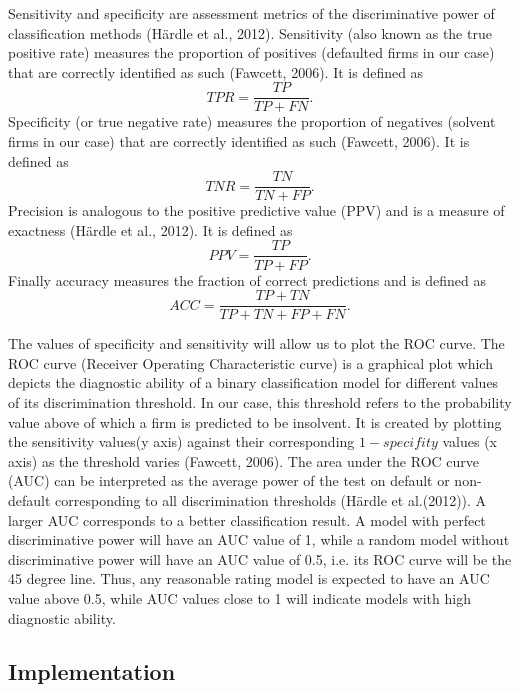 \documentclass{article}
\begin{document}
Sensitivity and specificity are assessment metrics of the discriminative power of classification methods (H{\"a}rdle et al., 2012). Sensitivity (also known as the true positive rate) measures the proportion of positives (defaulted firms in our case) that are correctly identified as such (Fawcett, 2006). It is defined as $$TPR=\frac{TP}{TP+FN}.$$ Specificity (or true negative rate) measures the proportion of negatives (solvent firms in our case) that are correctly identified as such (Fawcett, 2006). It is defined as $$TNR=\frac{TN}{TN+FP}.$$ Precision is analogous to the positive predictive value (PPV) and is a measure of exactness (H{\"a}rdle et al., 2012). It is defined as $$PPV=\frac{TP}{TP+FP}.$$ Finally accuracy measures the fraction of correct predictions and is defined as $$ACC = \frac{TP+TN}{TP+TN+FP+FN}.$$

The values of specificity and sensitivity will allow us to plot the ROC curve. The ROC curve (Receiver Operating Characteristic curve) is a graphical plot which depicts the diagnostic ability of a binary classification model for different values of its discrimination threshold. In our case, this threshold refers to the probability value above of which a firm is predicted to be insolvent. It is created by plotting the sensitivity values(y axis) against their corresponding $1-specifity$ values (x axis) as the threshold varies (Fawcett, 2006). The area under the ROC curve (AUC) can be interpreted as the average power of the test on default or non-default corresponding to all discrimination thresholds (H\"ardle et al.(2012)). A larger AUC corresponds to a better classification result. A model with perfect discriminative power will have an AUC value of 1, while a random model without discriminative power will have an AUC value of 0.5, i.e. its ROC curve will be the 45 degree line. Thus, any reasonable rating model is expected to have an AUC value above 0.5, while AUC values close to 1 will indicate models with high diagnostic ability.  

\subsection{Implementation}


\end{document}
